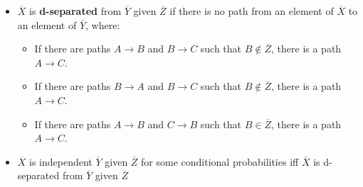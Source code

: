 \documentclass[12pt]{beamer} %
\begin{document}


\begin{slide}
\begin{itemize}
\item
$\overline{X}$ is \textbf{d-separated} from $\overline{Y}$ given $\overline{Z}$
if there is no path from an element of $\overline{X}$ to an element of
$\overline{Y}$,
where:
\begin{itemize}
\item If there are paths $A \rightarrow B$ and $B \rightarrow C$ such
that $B \not \in \overline{Z}$, there is a path $A\rightarrow C$.
\item If there are paths $B\rightarrow A$ and $B \rightarrow C$ such
that $B \not \in \overline{Z}$, there is a path $A \rightarrow C$.
\item If there are paths $A \rightarrow B$ and $C \rightarrow B$ such
that $B \in \overline{Z}$, there is a path $A \rightarrow C$.
\end{itemize}
\item $\overline{X}$ is independent $\overline{Y}$ given
$\overline{Z}$ for some conditional probabilities iff $\overline{X}$ is d-separated from $\overline{Y}$
given $\overline{Z}$
\end{itemize}

\end{slide}
\fi



\end{document}
